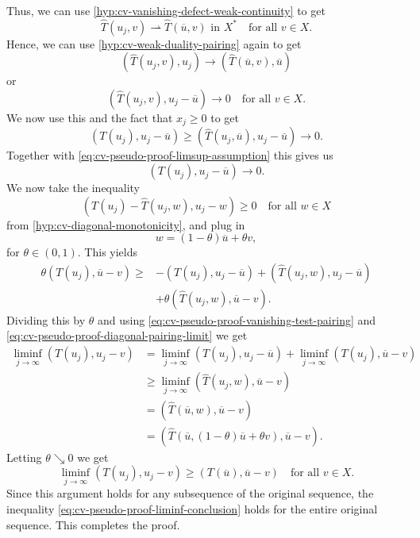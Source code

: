 \begin{Proof}
Thus, we can use \ref{hyp:cv-vanishing-defect-weak-continuity} to get
\begin{equation}\label{eq:cv-pseudo-proof-test-image-limit}
\widehat T(u_j,v)\rightharpoonup\widehat T(\overline u,v)\text{ in }X^*\quad\text{for all }v\in X.
\end{equation}
Hence, we can use \ref{hyp:cv-weak-duality-pairing} again to get\[(\widehat T(u_j,v),u_j)\to(\widehat T(\overline u,v),\overline u)\]or
\begin{equation}\label{eq:cv-pseudo-proof-vanishing-test-pairing}
(\widehat T(u_j,v),u_j-\overline u)\to0\quad\text{for all }v\in X.
\end{equation}
We now use this and the fact that $x_j\geq0$ to get
\begin{equation}\label{eq:cv-pseudo-proof-diagonal-comparison}
(T(u_j),u_j-\overline u)\geq(\widehat T(u_j,\overline u),u_j-\overline u)\to0.
\end{equation}
Together with \eqref{eq:cv-pseudo-proof-limsup-assumption} this gives us
\begin{equation}\label{eq:cv-pseudo-proof-diagonal-pairing-limit}
(T(u_j),u_j-\overline u)\to0.
\end{equation}
We now take the inequality\[(T(u_j)-\widehat T(u_j,w),u_j-w)\geq0\quad\text{for all }w\in X\]from \ref{hyp:cv-diagonal-monotonicity}, and plug in
\begin{equation}\label{eq:cv-pseudo-proof-intermediate-test-point}
w=(1-\theta)\overline u+\theta v,
\end{equation}
for $\theta\in(0,1)$. This yields
\begin{equation}\label{eq:cv-pseudo-proof-theta-inequality}
\begin{aligned}\theta(T(u_j),\overline u-v)\geq&-(T(u_j),u_j-\overline u)+(\widehat T(u_j,w),u_j-\overline u)\\&+\theta(\widehat T(u_j,w),\overline u-v).\end{aligned}
\end{equation}
Dividing this by $\theta$ and using \eqref{eq:cv-pseudo-proof-vanishing-test-pairing} and \eqref{eq:cv-pseudo-proof-diagonal-pairing-limit} we get\[\begin{aligned}
\liminf_{j\to\infty}(T(u_j),u_j-v)&=\liminf_{j\to\infty}(T(u_j),u_j-\overline u)+\liminf_{j\to\infty}(T(u_j),\overline u-v)\\
&\geq\liminf_{j\to\infty}(\widehat T(u_j,w),\overline u-v)\\
&=(\widehat T(\overline u,w),\overline u-v)\\
&=(\widehat T(\overline u,(1-\theta)\overline u+\theta v),\overline u-v).
\end{aligned}\]Letting $\theta\searrow0$ we get
\begin{equation}\label{eq:cv-pseudo-proof-liminf-conclusion}
\liminf_{j\to\infty}(T(u_j),u_j-v)\geq(T(\overline u),\overline u-v)\quad\text{for all }v\in X.
\end{equation}
Since this argument holds for any subsequence of the original sequence, the inequality \eqref{eq:cv-pseudo-proof-liminf-conclusion} holds for the entire original sequence. This completes the proof.
\end{Proof}
\endgroup

